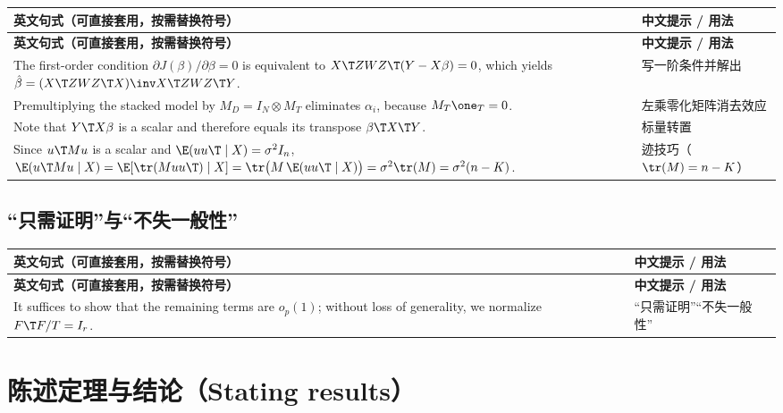 {\renewcommand{\arraystretch}{1.15}\begin{longtable}{@{}>{\raggedright\arraybackslash}p{11.4cm}>{\raggedright\arraybackslash\small}p{4.3cm}@{}}
\toprule
\textbf{英文句式（可直接套用，按需替换符号）} & \textbf{中文提示 / 用法}\\
\midrule
\endfirsthead
\toprule
\textbf{英文句式（可直接套用，按需替换符号）} & \textbf{中文提示 / 用法}\\
\midrule
\endhead
\bottomrule
\endlastfoot
The first-order condition $\partial J(\beta)/\partial\beta=0$ is equivalent to $X\T ZWZ\T(Y-X\beta)=0$, which yields $\hat\beta=(X\T ZWZ\T X)\inv X\T ZWZ\T Y$. & 写一阶条件并解出\\
\addlinespace[2pt]
Premultiplying the stacked model by $M_D=I_N\otimes M_T$ eliminates $\alpha_i$, because $M_T\one_T=0$. & 左乘零化矩阵消去效应\\
\addlinespace[2pt]
Note that $Y\T X\beta$ is a scalar and therefore equals its transpose $\beta\T X\T Y$. & 标量转置\\
\addlinespace[2pt]
Since $u\T Mu$ is a scalar and $\E(uu\T\mid X)=\sigma^2I_n$, $\E(u\T Mu\mid X)=\E[\tr(Muu\T)\mid X]=\tr\bigl(M\,\E(uu\T\mid X)\bigr)=\sigma^2\tr(M)=\sigma^2(n-K)$. & 迹技巧（$\tr(M)=n-K$）\\
\end{longtable}}


\subsection{“只需证明”与“不失一般性”}

{\renewcommand{\arraystretch}{1.15}\begin{longtable}{@{}>{\raggedright\arraybackslash}p{11.4cm}>{\raggedright\arraybackslash\small}p{4.3cm}@{}}
\toprule
\textbf{英文句式（可直接套用，按需替换符号）} & \textbf{中文提示 / 用法}\\
\midrule
\endfirsthead
\toprule
\textbf{英文句式（可直接套用，按需替换符号）} & \textbf{中文提示 / 用法}\\
\midrule
\endhead
\bottomrule
\endlastfoot
It suffices to show that the remaining terms are $o_p(1)$; without loss of generality, we normalize $F\T F/T=I_r$. & “只需证明”“不失一般性”\\
\end{longtable}}


\section{陈述定理与结论（Stating results）}\label{sec:UappC-results}

